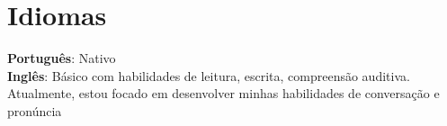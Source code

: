 \documentclass[letterpaper,11pt]{article}
\begin{document}
\section{Idiomas}
 \begin{itemize}[leftmargin=0.15in, label={}]
    \small{\item{
     \textbf{Português}{: Nativo} \\
    \textbf{Inglês}{: Básico com habilidades de leitura, escrita, compreensão auditiva. Atualmente, estou focado em desenvolver minhas habilidades de conversação e pronúncia } \\

    }}
 \end{itemize}

%
\end{document}
